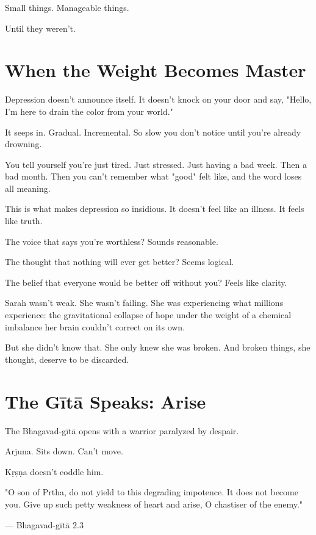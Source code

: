 \documentclass[11pt,twoside]{book}
\begin{document}
Small things. Manageable things.

Until they weren't.

\section*{When the Weight Becomes Master}

Depression doesn't announce itself. It doesn't knock on your door and say, "Hello, I'm here to drain the color from your world."

It seeps in. Gradual. Incremental. So slow you don't notice until you're already drowning.

You tell yourself you're just tired. Just stressed. Just having a bad week. Then a bad month. Then you can't remember what "good" felt like, and the word loses all meaning.

This is what makes depression so insidious. It doesn't feel like an illness. It feels like truth.

The voice that says you're worthless? Sounds reasonable.

The thought that nothing will ever get better? Seems logical.

The belief that everyone would be better off without you? Feels like clarity.

Sarah wasn't weak. She wasn't failing. She was experiencing what millions experience: the gravitational collapse of hope under the weight of a chemical imbalance her brain couldn't correct on its own.

But she didn't know that. She only knew she was broken. And broken things, she thought, deserve to be discarded.

\section*{The Gītā Speaks: Arise}

The Bhagavad-gītā opens with a warrior paralyzed by despair.

Arjuna. Sits down. Can't move.

Kṛṣṇa doesn't coddle him.

\begin{pullquote}
"O son of Prtha, do not yield to this degrading impotence. It does not become you. Give up such petty weakness of heart and arise, O chastiser of the enemy."

--- Bhagavad-gītā 2.3
\end{pullquote}
\end{document}
